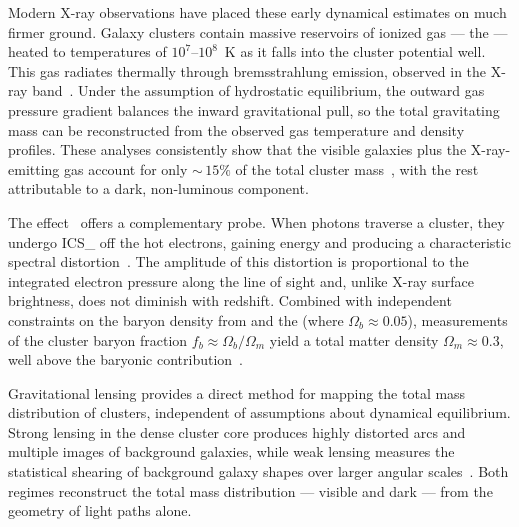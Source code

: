 Modern X-ray observations have placed these early dynamical estimates on much firmer ground.
Galaxy clusters contain massive reservoirs of ionized gas --- the \ICM --- heated to temperatures of $10^7$--$10^8$~K as it falls into the cluster potential well.
This gas radiates thermally through bremsstrahlung emission, observed in the X-ray band~\cite{Sarazin:1986zz}.
Under the assumption of hydrostatic equilibrium, the outward gas pressure gradient balances the inward gravitational pull, so the total gravitating mass can be reconstructed from the observed gas temperature and density profiles.
These analyses consistently show that the visible galaxies plus the X-ray-emitting gas account for only ${\sim}\,15\%$ of the total cluster mass~\cite{Cirelli:2024ssz}, with the rest attributable to a dark, non-luminous component.

The \SZ effect~\cite{Sunyaev:1972} offers a complementary probe.
When \CMB photons traverse a cluster, they undergo \gls{ICS_} off the hot \ICM electrons, gaining energy and producing a characteristic spectral distortion~\cite{Bullock:2017xww}.
The amplitude of this distortion is proportional to the integrated electron pressure along the line of sight and, unlike X-ray surface brightness, does not diminish with redshift.
Combined with independent constraints on the baryon density from \BBN and the \CMB (where $\Omega_b \approx 0.05$), \SZ measurements of the cluster baryon fraction $f_b \approx \Omega_b / \Omega_m$ yield a total matter density $\Omega_m \approx 0.3$, well above the baryonic contribution~\cite{Aghanim:2018eyx}.

Gravitational lensing provides a direct method for mapping the total mass distribution of clusters, independent of assumptions about dynamical equilibrium.
Strong lensing in the dense cluster core produces highly distorted arcs and multiple images of background galaxies, while weak lensing measures the statistical shearing of background galaxy shapes over larger angular scales~\cite{Bullock:2017xww}.
Both regimes reconstruct the total mass distribution --- visible and dark --- from the geometry of light paths alone.

